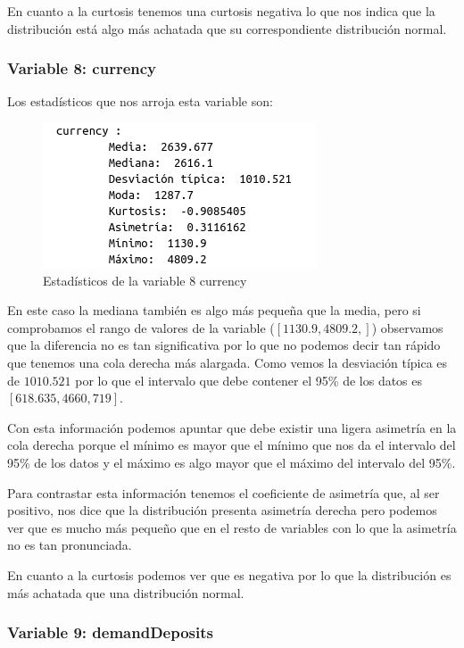 \documentclass[12pt,a4paper]{article}
\begin{document}
En cuanto a la curtosis tenemos una curtosis negativa lo que nos indica que la distribución está algo más achatada que su correspondiente distribución normal.

\subsubsection*{Variable 8: currency}

Los estadísticos que nos arroja esta variable son:

\begin{figure}[H]
	\centering
	\includegraphics[scale=0.7]{./Imagenes/estadisticos_currency.png}
	\caption{Estadísticos de la variable 8 currency}
\end{figure}

En este caso la mediana también es algo más pequeña que la media, pero si comprobamos el rango de valores de la variable ($[1130.9, 4809.2,]$) observamos que la diferencia no es tan significativa por lo que no podemos decir tan rápido que tenemos una cola derecha más alargada. Como vemos la desviación típica es de $1010.521$ por lo que el intervalo que debe contener el 95\% de los datos es $[618.635,4660,719]$. 

Con esta información podemos apuntar que debe existir una ligera asimetría en la cola derecha porque el mínimo es mayor que el mínimo que nos da el intervalo del 95\% de los datos y el máximo es algo mayor que el máximo del intervalo del 95\%.

Para contrastar esta información tenemos el coeficiente de asimetría que, al ser positivo, nos dice que la distribución presenta asimetría derecha pero podemos ver que es mucho más pequeño que en el resto de variables con lo que la asimetría no es tan pronunciada.

En cuanto a la curtosis podemos ver que es negativa por lo que la distribución es más achatada que una distribución normal.

\subsubsection*{Variable 9: demandDeposits}
\end{document}

